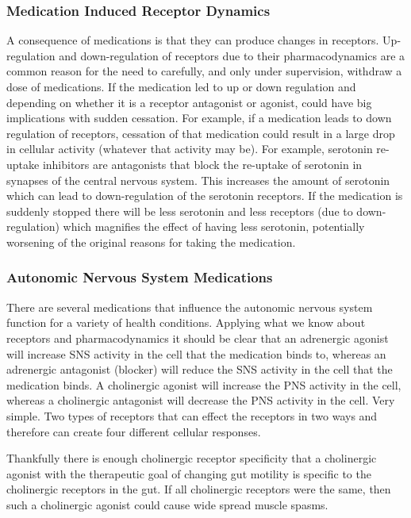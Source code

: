 \subsubsection{Medication Induced Receptor Dynamics}
A consequence of medications is that they can produce changes in receptors. Up-regulation and down-regulation of receptors due to their pharmacodynamics are a common reason for the need to carefully, and only under supervision, withdraw a dose of medications. If the medication led to up or down regulation and depending on whether it is a receptor antagonist or agonist, could have big implications with sudden cessation. For example, if a medication leads to down regulation of receptors, cessation of that medication could result in a large drop in cellular activity (whatever that activity may be). For example, serotonin re-uptake inhibitors are antagonists that block the re-uptake of serotonin in synapses of the central nervous system. This increases the amount of serotonin which can lead to down-regulation of the serotonin receptors. If the medication is suddenly stopped there will be less serotonin and less receptors (due to down-regulation) which magnifies the effect of having less serotonin, potentially worsening of the original reasons for taking the medication. 

\subsubsection{Autonomic Nervous System Medications}

There are several medications that influence the autonomic nervous system function for a variety of health conditions. Applying what we know about receptors and pharmacodynamics it should be clear that an adrenergic agonist will increase SNS activity in the cell that the medication binds to, whereas an adrenergic antagonist (blocker) will reduce the SNS activity in the cell that the medication binds. A cholinergic agonist will increase the PNS activity in the cell, whereas a cholinergic antagonist will decrease the PNS activity in the cell. Very simple. Two types of receptors that can effect the receptors in two ways and therefore can create four different cellular responses. 

Thankfully there is enough cholinergic receptor specificity that a cholinergic agonist with the therapeutic goal of changing gut motility is specific to the cholinergic receptors in the gut. If all cholinergic receptors were the same, then such a cholinergic agonist could cause wide spread muscle spasms.

